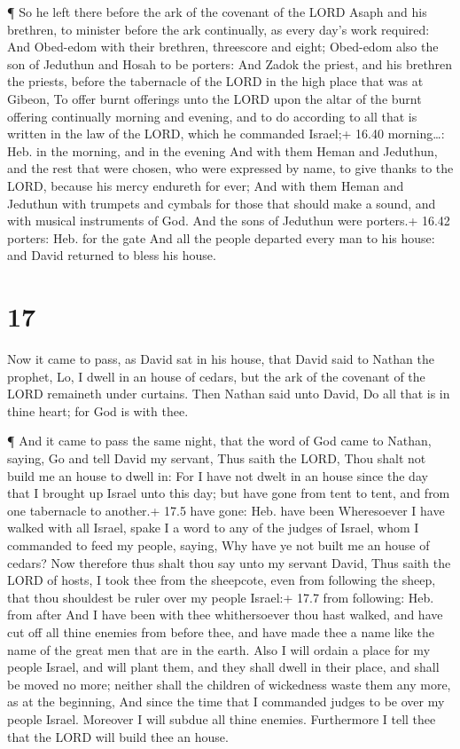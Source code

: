  ¶ So he left there before the ark of the covenant of the
LORD Asaph and his brethren, to minister before the ark continually, as
every day's work required:  And Obed-edom with their
brethren, threescore and eight; Obed-edom also the son of Jeduthun and
Hosah to be porters:  And Zadok the priest, and his
brethren the priests, before the tabernacle of the LORD in the high
place that was at Gibeon,  To offer burnt offerings unto
the LORD upon the altar of the burnt offering continually morning and
evening, and to do according to all that is written in the law of the
LORD, which he commanded Israel;+ 16.40 morning\ldots: Heb. in the
morning, and in the evening  And with them Heman and
Jeduthun, and the rest that were chosen, who were expressed by name, to
give thanks to the LORD, because his mercy endureth for ever;
 And with them Heman and Jeduthun with trumpets and cymbals
for those that should make a sound, and with musical instruments of God.
And the sons of Jeduthun were porters.+ 16.42 porters: Heb. for the gate
 And all the people departed every man to his house: and
David returned to bless his house.

\hypertarget{section-16}{%
\section{17}\label{section-16}}

 Now it came to pass, as David sat in his house, that David
said to Nathan the prophet, Lo, I dwell in an house of cedars, but the
ark of the covenant of the LORD remaineth under curtains. 
Then Nathan said unto David, Do all that is in thine heart; for God is
with thee.

 ¶ And it came to pass the same night, that the word of God
came to Nathan, saying,  Go and tell David my servant, Thus
saith the LORD, Thou shalt not build me an house to dwell in:
 For I have not dwelt in an house since the day that I
brought up Israel unto this day; but have gone from tent to tent, and
from one tabernacle to another.+ 17.5 have gone: Heb. have been
 Wheresoever I have walked with all Israel, spake I a word
to any of the judges of Israel, whom I commanded to feed my people,
saying, Why have ye not built me an house of cedars?  Now
therefore thus shalt thou say unto my servant David, Thus saith the LORD
of hosts, I took thee from the sheepcote, even from following the sheep,
that thou shouldest be ruler over my people Israel:+ 17.7 from
following: Heb. from after  And I have been with thee
whithersoever thou hast walked, and have cut off all thine enemies from
before thee, and have made thee a name like the name of the great men
that are in the earth.  Also I will ordain a place for my
people Israel, and will plant them, and they shall dwell in their place,
and shall be moved no more; neither shall the children of wickedness
waste them any more, as at the beginning,  And since the
time that I commanded judges to be over my people Israel. Moreover I
will subdue all thine enemies. Furthermore I tell thee that the LORD
will build thee an house.

